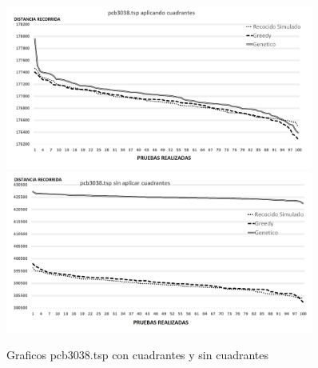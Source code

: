  \begin{figure}[hbtp]
    \centering
        \includegraphics[width=0.9\textwidth]{PruebasResultados/Experimentos_Graficos_Con/pcb3038.png}
        \includegraphics[width=0.9\textwidth]{PruebasResultados/Experimentos_Graficos_Sin/pcb3038.png}
        \caption{Graficos pcb3038.tsp con cuadrantes y sin cuadrantes}
        \label{fig:pcb3038_grafica.png}
\end{figure}
\newpage


